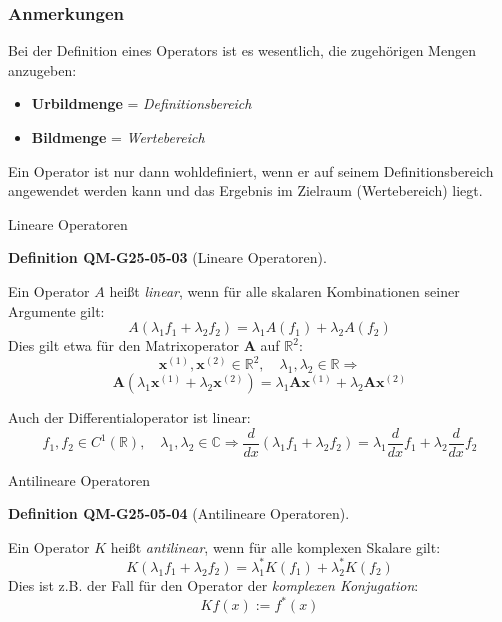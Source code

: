 \documentclass[10pt, letterpaper]{article}
\newcommand{\CustomHeading}[3]{%
  \par\medskip\noindent%
  \textbf{#1 #2} \textnormal{(#3)}.\enskip%
}
\newenvironment{DEF}[2]{\begin{unitbox}\CustomHeading{Definition}{#1}{#2}}{\end{unitbox}}
\begin{document}
\subsubsection*{Anmerkungen}
Bei der Definition eines Operators ist es wesentlich, die zugehörigen Mengen anzugeben:

\begin{itemize}
  \item \textbf{Urbildmenge} = \emph{Definitionsbereich}
  \item \textbf{Bildmenge} = \emph{Wertebereich}
\end{itemize}

Ein Operator ist nur dann wohldefiniert, wenn er auf seinem Definitionsbereich angewendet werden kann und das Ergebnis im Zielraum (Wertebereich) liegt.

\vspace{1em}




Lineare Operatoren

\begin{DEF}{QM-G25-05-03}{Lineare Operatoren}
Ein Operator $A$ heißt \emph{linear}, wenn für alle skalaren Kombinationen seiner Argumente gilt:
\[
A(\lambda_1 f_1 + \lambda_2 f_2) = \lambda_1 A(f_1) + \lambda_2 A(f_2)
\]
Dies gilt etwa für den Matrixoperator $\mathbf{A}$ auf $\mathbb{R}^2$:
\[
\mathbf{x}^{(1)}, \mathbf{x}^{(2)} \in \mathbb{R}^{2}, \quad \lambda_1, \lambda_2 \in \mathbb{R} \Rightarrow
\]
\[
\mathbf{A}(\lambda_1 \mathbf{x}^{(1)} + \lambda_2 \mathbf{x}^{(2)}) = \lambda_1 \mathbf{A} \mathbf{x}^{(1)} + \lambda_2 \mathbf{A} \mathbf{x}^{(2)}
\]

Auch der Differentialoperator ist linear:
\[
f_1, f_2 \in C^1(\mathbb{R}), \quad \lambda_1, \lambda_2 \in \mathbb{C}
\Rightarrow
\frac{d}{dx}(\lambda_1 f_1 + \lambda_2 f_2)
= \lambda_1 \frac{d}{dx} f_1 + \lambda_2 \frac{d}{dx} f_2
\]
\end{DEF}

\vspace{1em}




Antilineare Operatoren


\begin{DEF}{QM-G25-05-04}{Antilineare Operatoren}
Ein Operator $K$ heißt \emph{antilinear}, wenn für alle komplexen Skalare gilt:
\[
K(\lambda_1 f_1 + \lambda_2 f_2) = \lambda_1^* K(f_1) + \lambda_2^* K(f_2)
\]
Dies ist z.B. der Fall für den Operator der \emph{komplexen Konjugation}:
\[
K f(x) := f^*(x)
\]
\end{DEF}
\end{document}

